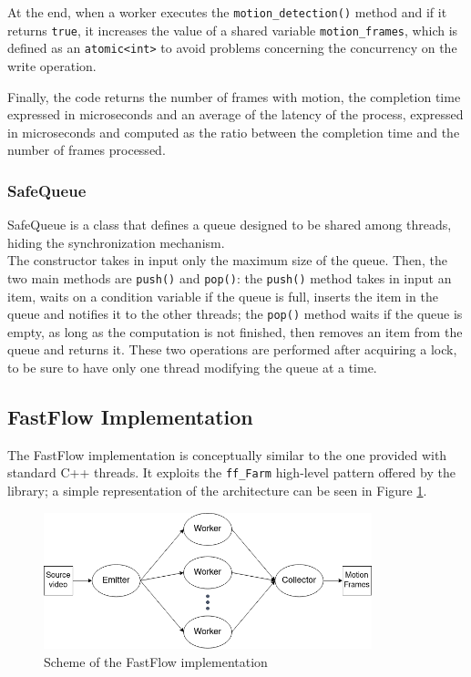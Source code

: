 At the end, when a worker executes the \texttt{motion\_detection()} method and if it returns \texttt{true}, it increases the value of a shared variable \texttt{motion\_frames}, which is defined as an \texttt{atomic<int>} to avoid problems concerning the concurrency on the write operation.

Finally, the code returns the number of frames with motion, the completion time expressed in microseconds and an average of the latency of the process, expressed in microseconds and computed as the ratio between the completion time and the number of frames processed.

\subsubsection{SafeQueue} \label{sec:safequeue}
SafeQueue is a class that defines a queue designed to be shared among threads, hiding the synchronization mechanism.\\
The constructor takes in input only the maximum size of the queue. Then, the two main methods are \texttt{push()} and \texttt{pop()}: the \texttt{push()} method takes in input an item, waits on a condition variable if the queue is full, inserts the item in the queue and notifies it to the other threads; the \texttt{pop()} method waits if the queue is empty, as long as the computation is not finished, then removes an item from the queue and returns it. These two operations are performed after acquiring a lock, to be sure to have only one thread modifying the queue at a time.

\subsection{FastFlow Implementation}
The FastFlow implementation is conceptually similar to the one provided with standard C++ threads. It exploits the \texttt{ff\_Farm} high-level pattern offered by the library; a simple representation of the architecture can be seen in Figure \ref{fig:ff_code}.

\begin{figure}[h]
    \includegraphics[width=0.85\textwidth]{img/ff_code.png}
    \centering
    \caption{Scheme of the FastFlow implementation}
    \label{fig:ff_code}
\end{figure}

